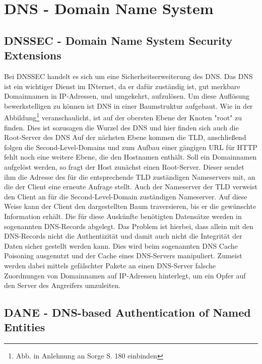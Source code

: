 \chapter{DNS - Domain Name System}
\section{DNSSEC - Domain Name System Security Extensions}
	Bei \ac{DNSSEC} handelt es sich um eine Sicherheitserweiterung des \ac{DNS}.
	Das \ac{DNS} ist ein wichtiger Dienst im INternet, da er dafür zuständig ist, gut merkbare Domainnamen in \ac{IP}-Adressen, und umgekehrt, aufzulösen.
	Um diese Auflösung bewerkstelligen zu können ist \ac{DNS} in einer Baumstruktur aufgebaut. 
	Wie in der Abbildung\footnote{Abb. in Anlehnung an Sorge S. 180 einbinden} veranschaulicht, ist auf der obersten Ebene der Knoten "root" zu finden.
	Dies ist sozusagen die Wurzel des \ac{DNS} und hier finden sich auch die Root-Server des \ac{DNS}
	Auf der nächsten Ebene kommen die \ac{TLD}, anschließend folgen die Second-Level-Domains und zum Aufbau einer gängigen \ac{URL} für \ac{HTTP} fehlt noch eine weitere Ebene, die den Hostnamen enthält.
	Soll ein Domainnamen aufgelöst werden, so fragt der Host zunächst einen Root-Server.
	Dieser sendet ihm die Adresse des für die entsprechende \ac{TLD} zuständigen Nameservers mit, an die der Client eine erneute Anfrage stellt.
	Auch der Nameserver der \ac{TLD} verweist den Client an für die Second-Level-Domain zuständigen Nameserver.
	Auf diese Weise kann der Client den dargestellten Baum traversieren, bis er die gewünschte Information erhält.
	Die für diese Auskünfte benötigten Datensätze werden in sogenannten \ac{DNS}-Records abgelegt.
	Das Problem ist hierbei, dass allein mit den \ac{DNS}-Records nicht die Authentizität und damit auch nicht die Integrität der Daten sicher gestellt werden kann.
	Dies wird beim sogenannten \ac{DNS} Cache Poisoning %
	 ausgenutzt und der Cache eines \ac{DNS}-Servers manipuliert.
	Zumeist werden dabei mittels gefälschter Pakete an einen \ac{DNS}-Server falsche Zuordnungen von Domainnamen auf \ac{IP}-Adressen hinterlegt, um ein Opfer auf den Server des Angreifers umzuleiten.
\section{DANE - DNS-based Authentication of Named Entities}
\label{sec:dane}
